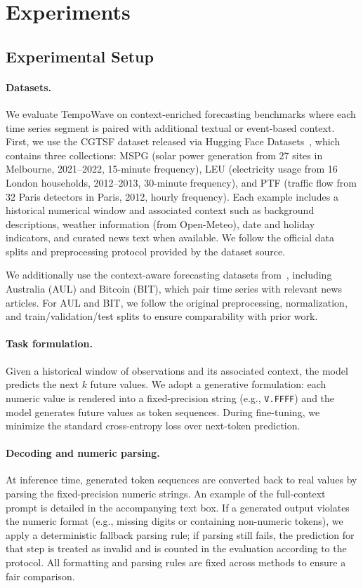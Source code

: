 \documentclass{article}
\begin{document}
\section{Experiments}
\label{sec:experiments}

\subsection{Experimental Setup}
\label{app:dataset_desc}

\paragraph{Datasets.}
We evaluate TempoWave on context-enriched forecasting benchmarks where each time series segment is paired with additional textual or event-based context.
First, we use the CGTSF dataset released via Hugging Face Datasets~\cite{liu2024chattime}, which contains three collections:
MSPG (solar power generation from 27 sites in Melbourne, 2021--2022, 15-minute frequency),
LEU (electricity usage from 16 London households, 2012--2013, 30-minute frequency),
and PTF (traffic flow from 32 Paris detectors in Paris, 2012, hourly frequency).
Each example includes a historical numerical window and associated context such as background descriptions, weather information (from Open-Meteo), date and holiday indicators, and curated news text when available.
We follow the official data splits and preprocessing protocol provided by the dataset source.

We additionally use the context-aware forecasting datasets from~\cite{wang2024newsforecast}, including Australia (AUL) and Bitcoin (BIT), which pair time series with relevant news articles.
For AUL and BIT, we follow the original preprocessing, normalization, and train/validation/test splits to ensure comparability with prior work.

\paragraph{Task formulation.}
Given a historical window of observations and its associated context, the model predicts the next $k$ future values.
We adopt a generative formulation: each numeric value is rendered into a fixed-precision string (e.g., \texttt{V.FFFF}) and the model generates future values as token sequences.
During fine-tuning, we minimize the standard cross-entropy loss over next-token prediction.

\paragraph{Decoding and numeric parsing.}
At inference time, generated token sequences are converted back to real values by parsing the fixed-precision numeric strings. An example of the full-context prompt is detailed in the accompanying text box.
If a generated output violates the numeric format (e.g., missing digits or containing non-numeric tokens), we apply a deterministic fallback parsing rule; if parsing still fails, the prediction for that step is treated as invalid and is counted in the evaluation according to the protocol.
All formatting and parsing rules are fixed across methods to ensure a fair comparison.
\end{document}
